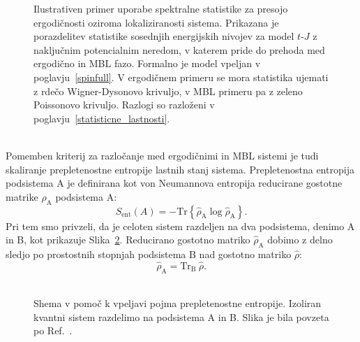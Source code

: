 \begin{figure}[H]
\caption{Ilustrativen primer uporabe spektralne statistike za presojo ergodičnosti oziroma lokaliziranosti sistema. Prikazana je porazdelitev statistike sosednjih energijskih nivojev za model $t$-$J$ z naključnim potencialnim neredom, v katerem pride do prehoda med ergodično in MBL fazo. Formalno je model vpeljan v poglavju~\ref{spinfull}. V ergodičnem primeru se mora statistika ujemati z rdečo Wigner-Dysonovo krivuljo, v MBL primeru pa z zeleno Poissonovo krivuljo. Razlogi so razloženi v poglavju~\ref{statisticne_lastnosti}.
}
\label{fig:unfolding_demo}
\end{figure}
\noindent
\begin{minipage}[t]{0.65\textwidth}
\noindent \\
Pomemben kriterij za razločanje med ergodičnimi in MBL sistemi je tudi skaliranje prepletenostne entropije lastnih stanj sistema. Prepletenostna entropija podsistema A je definirana kot von Neumannova entropija reducirane gostotne matrike $\hat{\rho}_\mathrm{A}$ podsistema A: 
\begin{equation}\label{eq:entanglement}
S_\mathrm{ent}\left(A\right)=-\mathrm{Tr}\left\{ \hat{\rho}_\mathrm{A}\log \hat{\rho}_\mathrm{A}\right\}.
\end{equation}
Pri tem smo privzeli, da je celoten sistem razdeljen na dva podsistema, denimo A in B, kot prikazuje Slika~\ref{fig:nandkishore_huse_subsystems}. Reducirano gostotno matriko $\hat{\rho}_\mathrm{A}$ dobimo z delno sledjo  po prostostnih stopnjah podsistema B nad gostotno matriko $\hat{\rho}$:
\begin{equation}
\hat{\rho}_\mathrm{A}=\mathrm{Tr}_\mathrm{B}\	 \hat{\rho}.
\end{equation}\\
\end{minipage}\hfill
\begin{minipage}[t]{0.32\textwidth}
\begin{figure}[H]
\caption{
Shema v pomoč k vpeljavi pojma prepletenostne entropije. Izoliran kvantni sistem razdelimo na podsistema A in B.
Slika je bila povzeta po Ref.~\cite{nandkishore2015many}. 
}
\label{fig:nandkishore_huse_subsystems}
\end{figure}
\end{minipage}

